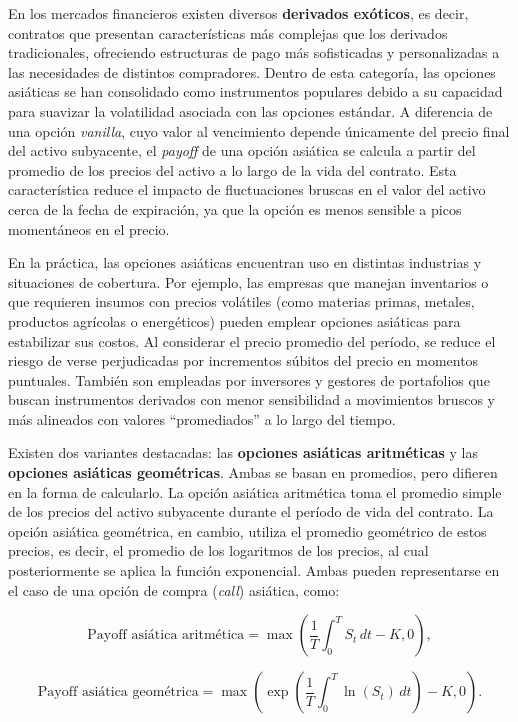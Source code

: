 \documentclass[11pt,a4paper,spanish]{article}
\numberwithin{equation}{section} %
\begin{document}
En los mercados financieros existen diversos\textbf{ derivados exóticos}, es decir, contratos que presentan características más complejas que los derivados tradicionales, ofreciendo estructuras de pago más sofisticadas y personalizadas a las necesidades de distintos compradores. Dentro de esta categoría, las opciones asiáticas se han consolidado como instrumentos populares debido a su capacidad para suavizar la volatilidad asociada con las opciones estándar. A diferencia de una opción \textit{vanilla}, cuyo valor al vencimiento depende únicamente del precio final del activo subyacente, el \textit{payoff} de una opción asiática se calcula a partir del promedio de los precios del activo a lo largo de la vida del contrato. Esta característica reduce el impacto de fluctuaciones bruscas en el valor del activo cerca de la fecha de expiración, ya que la opción es menos sensible a picos momentáneos en el precio.

En la práctica, las opciones asiáticas encuentran uso en distintas industrias y situaciones de cobertura. Por ejemplo, las empresas que manejan inventarios o que requieren insumos con precios volátiles (como materias primas, metales, productos agrícolas o energéticos) pueden emplear opciones asiáticas para estabilizar sus costos. Al considerar el precio promedio del período, se reduce el riesgo de verse perjudicadas por incrementos súbitos del precio en momentos puntuales. También son empleadas por inversores y gestores de portafolios que buscan instrumentos derivados con menor sensibilidad a movimientos bruscos y más alineados con valores “promediados” a lo largo del tiempo.

Existen dos variantes destacadas: las \textbf{opciones asiáticas aritméticas} y las \textbf{opciones asiáticas geométricas}. Ambas se basan en promedios, pero difieren en la forma de calcularlo. La opción asiática aritmética toma el promedio simple de los precios del activo subyacente durante el período de vida del contrato. La opción asiática geométrica, en cambio, utiliza el promedio geométrico de estos precios, es decir, el promedio de los logaritmos de los precios, al cual posteriormente se aplica la función exponencial. Ambas pueden representarse en el caso de una opción de compra (\textit{call}) asiática, como:

\begin{equation}
\text{Payoff asiática aritmética} = \max\left( \frac{1}{T}\int_0^T S_t \, dt - K, 0 \right),
\end{equation}

\begin{equation}
\text{Payoff asiática geométrica} = \max\left( \exp\left(\frac{1}{T} \int_0^T \ln(S_t) \, dt\right) - K, 0 \right).
\end{equation}
\end{document}
